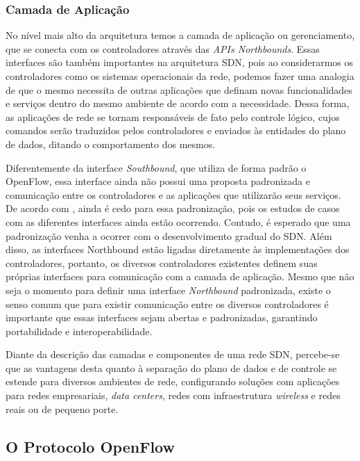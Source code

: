 \subsubsection{Camada de Aplicação}

No nível mais alto da arquitetura temos a camada de aplicação ou gerenciamento, que se conecta com os controladores através das \emph{APIs Northbounds}. Essas interfaces são também importantes na arquitetura SDN, pois ao considerarmos os controladores como os sistemas operacionais da rede, podemos fazer uma analogia de que o mesmo necessita de outras aplicações que definam novas funcionalidades e serviços dentro do mesmo ambiente de acordo com a necessidade. Dessa forma, as aplicações de rede se tornam responsáveis de fato pelo controle lógico, cujos comandos serão traduzidos pelos controladores e enviados às entidades do plano de dados, ditando o comportamento dos mesmos.\cite{Nunes}
       
       Diferentemente da interface \emph{Southbound}, que utiliza de forma padrão o OpenFlow, essa interface ainda não possui uma proposta padronizada e comunicação entre os controladores e as aplicações que utilizarão seus serviços. De acordo com  , ainda é cedo para essa padronização, pois os estudos de casos com as diferentes interfaces ainda estão ocorrendo. Contudo, é esperado que uma padronização venha a ocorrer com o desenvolvimento gradual do SDN. Além disso, as interfaces Northbound estão ligadas diretamente às implementações dos controladores, portanto, os diversos controladores existentes definem suas próprias interfaces para comunicação com a camada de aplicação. Mesmo que não seja o momento para definir uma interface \emph{Northbound} padronizada, existe o senso comum que para existir comunicação entre os diversos controladores é importante que essas interfaces sejam abertas e padronizadas, garantindo portabilidade e interoperabilidade. 
     

  
\par Diante da descrição das camadas e componentes de uma rede SDN, percebe-se que as vantagens desta quanto à separação do plano de dados e de controle se estende para diversos ambientes de rede, configurando soluções com aplicações para redes empresariais, \emph{data centers}, redes com infraestrutura \emph{wireless} e redes reais ou de pequeno porte.\cite{Nunes}


\subsection{O Protocolo OpenFlow}

